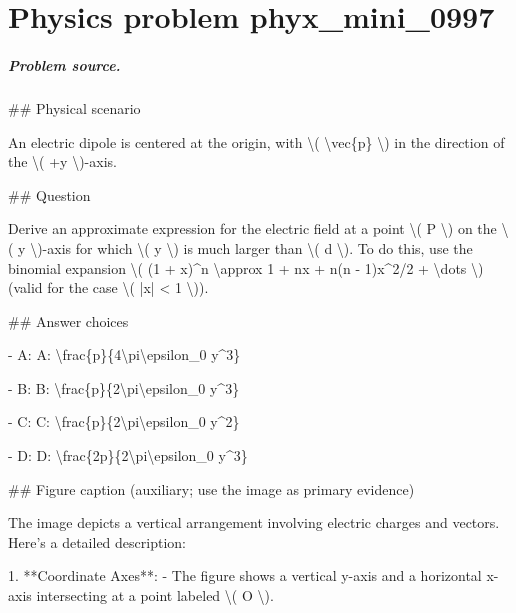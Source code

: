 
\chapter{Physics problem phyx\_mini\_0997}
\label{ch:PhyXMiniProblems_problem_phyx_mini_0997}

\paragraph{Problem source.}
\#\# Physical scenario

An electric dipole is centered at the origin, with \textbackslash{}( \textbackslash{}vec\{p\} \textbackslash{}) in the direction of the \textbackslash{}( +y \textbackslash{})-axis.

\#\# Question

Derive an approximate expression for the electric field at a point \textbackslash{}( P \textbackslash{}) on the \textbackslash{}( y \textbackslash{})-axis for which \textbackslash{}( y \textbackslash{}) is much larger than \textbackslash{}( d \textbackslash{}). To do this, use the binomial expansion \textbackslash{}( (1 + x)\textasciicircum{}n \textbackslash{}approx 1 + nx + n(n - 1)x\textasciicircum{}2/2 + \textbackslash{}dots \textbackslash{}) (valid for the case \textbackslash{}( |x| < 1 \textbackslash{})).

\#\# Answer choices

- A: A: \textbackslash{}frac\{p\}\{4\textbackslash{}pi\textbackslash{}epsilon\_0 y\textasciicircum{}3\}

- B: B: \textbackslash{}frac\{p\}\{2\textbackslash{}pi\textbackslash{}epsilon\_0 y\textasciicircum{}3\}

- C: C: \textbackslash{}frac\{p\}\{2\textbackslash{}pi\textbackslash{}epsilon\_0 y\textasciicircum{}2\}

- D: D: \textbackslash{}frac\{2p\}\{2\textbackslash{}pi\textbackslash{}epsilon\_0 y\textasciicircum{}3\}

\#\# Figure caption (auxiliary; use the image as primary evidence)

The image depicts a vertical arrangement involving electric charges and vectors. Here’s a detailed description:

1. **Coordinate Axes**: 
   - The figure shows a vertical y-axis and a horizontal x-axis intersecting at a point labeled \textbackslash{}( O \textbackslash{}).

